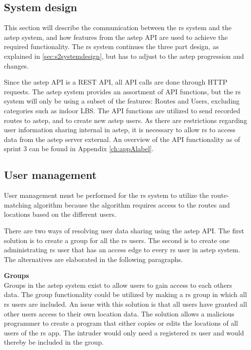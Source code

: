 \subsection{System design}
\label{sec:aSTEPCommunication.tex}
This section will describe the communication between the \gls{rs} system and the \gls{astep} system, and how features from the \gls{astep} API are used to achieve the required functionality.
The \gls{rs} system continues the three part design, as explained in \ref{sec:s2systemdesign}, but has to adjust to the \gls{astep} progression and changes.

Since the \gls{astep} API is a REST API, all API calls are done through HTTP requests.
The \gls{astep} system provides an assortment of API functions, but the \gls{rs} system will only be using a subset of the features: Routes and Users, excluding categories such as indoor LBS.
The API functions are utilized to send recorded routes to \gls{astep}, and to create new \gls{astep} users.
As there are restrictions regarding user information sharing internal in \gls{astep}, it is necessary to allow \gls{rs} to access data from the \gls{astep} server external.
An overview of the API functionality as of sprint 3 can be found in Appendix \ref{ch:appAlabel}. 

\subsection{User management}\label{subsec:usermanagement}
User management must be performed for the \gls{rs} system to utilize the route-matching algorithm because the algorithm requires access to the routes and locations based on the different users.

There are two ways of resolving user data sharing using the \gls{astep} API.
The first solution is to create a group for all the \gls{rs} users.
The second is to create one administrating \gls{rs} user that has an access edge to every \gls{rs} user in \gls{astep} system.
The alternatives are elaborated in the following paragraphs.

\textbf{Groups}\\ 
Groups in the \gls{astep} system exist to allow users to gain access to each others data.
The group functionality could be utilized by making a \gls{rs} group in which all \gls{rs} users are included.
An issue with this solution is that all users have granted all other users access to their own location data. 
The solution allows a malicious programmer to create a program that either copies or edits the locations of all users of the \gls{rs} app.
The intruder would only need a registered \gls{rs} user and would thereby be included in the group.

